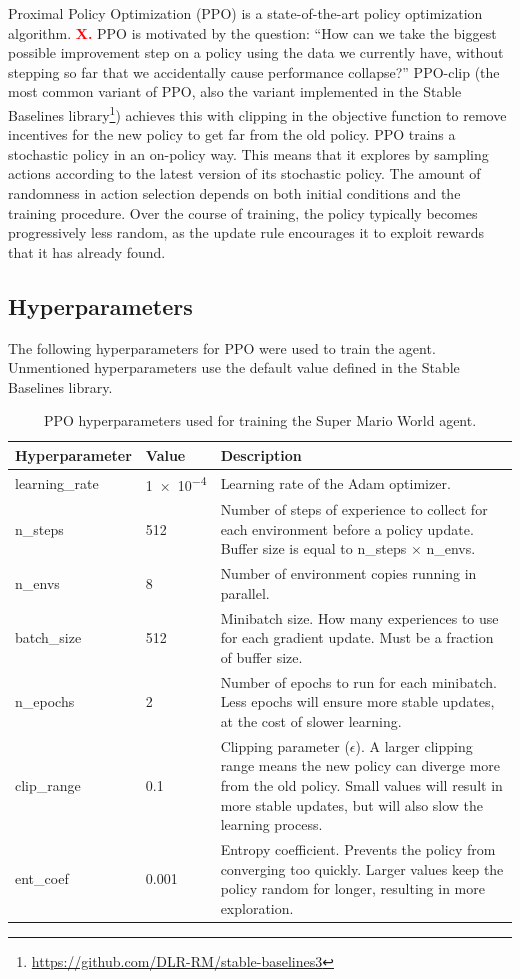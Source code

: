 \documentclass[a4paper]{article}
\begin{document}
Proximal Policy Optimization (PPO) \cite{schulman2017proximal} is a state-of-the-art policy optimization algorithm.
\textbf{\textcolor{red}{X.}}
PPO is motivated by the question: ``How can we take the biggest possible improvement step on a policy using the data we currently have, without stepping so far that we accidentally cause performance collapse?''
PPO-clip (the most common variant of PPO, also the variant implemented in the Stable Baselines library\footnote{\url{https://github.com/DLR-RM/stable-baselines3}}) achieves this with clipping in the objective function to remove incentives for the new policy to get far from the old policy.
PPO trains a stochastic policy in an on-policy way.
This means that it explores by sampling actions according to the latest version of its stochastic policy.
The amount of randomness in action selection depends on both initial conditions and the training procedure.
Over the course of training, the policy typically becomes progressively less random, as the update rule encourages it to exploit rewards that it has already found.

\subsection{Hyperparameters}
The following hyperparameters for PPO were used to train the agent.
Unmentioned hyperparameters use the default value defined in the Stable Baselines library.
\begin{table}[htbp]
\centering
\begin{tabularx}{\linewidth}{llX}
\toprule
Hyperparameter & Value & Description \tabularnewline
\midrule
learning\_rate & \num{1e-4} & Learning rate of the Adam optimizer. \tabularnewline
n\_steps & 512 & Number of steps of experience to collect for each environment before a policy update. Buffer size is equal to n\_steps $\times$ n\_envs. \tabularnewline
n\_envs & 8 & Number of environment copies running in parallel. \tabularnewline
batch\_size & 512 & Minibatch size. How many experiences to use for each gradient update. Must be a fraction of buffer size. \tabularnewline
n\_epochs & 2 & Number of epochs to run for each minibatch. Less epochs will ensure more stable updates, at the cost of slower learning. \tabularnewline
clip\_range & 0.1 & Clipping parameter ($\epsilon$). A larger clipping range means the new policy can diverge more from the old policy. Small values will result in more stable updates, but will also slow the learning process. \tabularnewline
ent\_coef & 0.001 & Entropy coefficient. Prevents the policy from converging too quickly. Larger values keep the policy random for longer, resulting in more exploration. \tabularnewline
\bottomrule
\end{tabularx}
\caption{PPO hyperparameters used for training the Super Mario World agent.}
\label{table:hyperparams}
\end{table}
\end{document}
